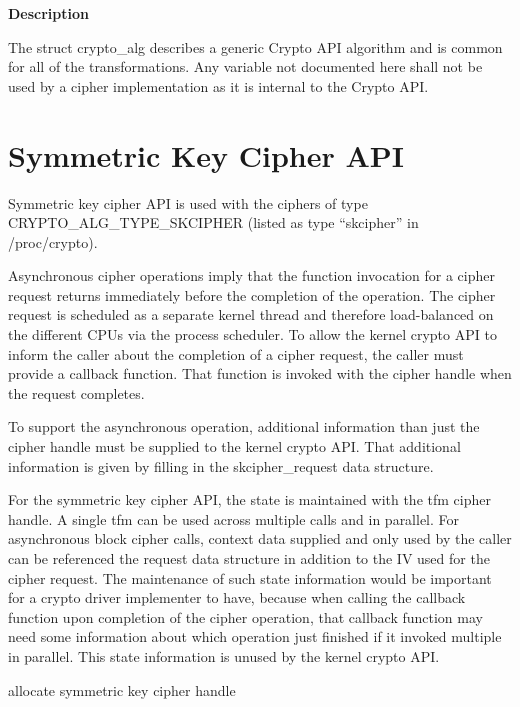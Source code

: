 \documentclass[a4paper,8pt,english]{sphinxmanual}
\begin{document}
\textbf{Description}

The struct crypto\_alg describes a generic Crypto API algorithm and is common
for all of the transformations. Any variable not documented here shall not
be used by a cipher implementation as it is internal to the Crypto API.


\section{Symmetric Key Cipher API}
\label{crypto/api-skcipher:symmetric-key-cipher-api}
Symmetric key cipher API is used with the ciphers of type
CRYPTO\_ALG\_TYPE\_SKCIPHER (listed as type ``skcipher'' in /proc/crypto).

Asynchronous cipher operations imply that the function invocation for a
cipher request returns immediately before the completion of the operation.
The cipher request is scheduled as a separate kernel thread and therefore
load-balanced on the different CPUs via the process scheduler. To allow
the kernel crypto API to inform the caller about the completion of a cipher
request, the caller must provide a callback function. That function is
invoked with the cipher handle when the request completes.

To support the asynchronous operation, additional information than just the
cipher handle must be supplied to the kernel crypto API. That additional
information is given by filling in the skcipher\_request data structure.

For the symmetric key cipher API, the state is maintained with the tfm
cipher handle. A single tfm can be used across multiple calls and in
parallel. For asynchronous block cipher calls, context data supplied and
only used by the caller can be referenced the request data structure in
addition to the IV used for the cipher request. The maintenance of such
state information would be important for a crypto driver implementer to
have, because when calling the callback function upon completion of the
cipher operation, that callback function may need some information about
which operation just finished if it invoked multiple in parallel. This
state information is unused by the kernel crypto API.

\begin{fulllineitems}
\label{crypto/api-skcipher:c.crypto_alloc_skcipher}
allocate symmetric key cipher handle

\end{fulllineitems}
\end{document}
